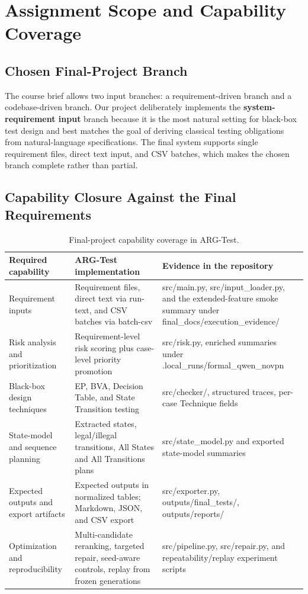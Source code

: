 \documentclass{article}
\renewcommand{\texttt}[1]{{\normalfont #1}}
\begin{document}
\section{Assignment Scope and Capability Coverage}
\subsection{Chosen Final-Project Branch}
The course brief allows two input branches: a requirement-driven branch and a codebase-driven branch. Our project deliberately implements the \textbf{system-requirement input} branch because it is the most natural setting for black-box test design and best matches the goal of deriving classical testing obligations from natural-language specifications. The final system supports single requirement files, direct text input, and CSV batches, which makes the chosen branch complete rather than partial.

\subsection{Capability Closure Against the Final Requirements}
\begin{table}[t]
\centering
\small
\caption{Final-project capability coverage in ARG-Test.}
\label{tab:capability}
\begin{tabular}{p{} p{} p{}}
\toprule
\textbf{Required capability} & \textbf{ARG-Test implementation} & \textbf{Evidence in the repository} \\
\midrule
Requirement inputs & Requirement files, direct text via \texttt{run-text}, and CSV batches via \texttt{batch-csv} & \texttt{src/main.py}, \texttt{src/input\_loader.py}, and the extended-feature smoke summary under \texttt{final\_docs/execution\_evidence/} \\
Risk analysis and prioritization & Requirement-level risk scoring plus case-level priority promotion & \texttt{src/risk.py}, enriched summaries under \texttt{.local\_runs/formal\_qwen\_novpn} \\
Black-box design techniques & EP, BVA, Decision Table, and State Transition testing & \texttt{src/checker/}, structured traces, per-case \texttt{Technique} fields \\
State-model and sequence planning & Extracted states, legal/illegal transitions, All States and All Transitions plans & \texttt{src/state\_model.py} and exported state-model summaries \\
Expected outputs and export artifacts & Expected outputs in normalized tables; Markdown, JSON, and CSV export & \texttt{src/exporter.py}, \texttt{outputs/final\_tests/}, \texttt{outputs/reports/} \\
Optimization and reproducibility & Multi-candidate reranking, targeted repair, seed-aware controls, replay from frozen generations & \texttt{src/pipeline.py}, \texttt{src/repair.py}, and repeatability/replay experiment scripts \\
\bottomrule
\end{tabular}
\end{table}
\end{document}
